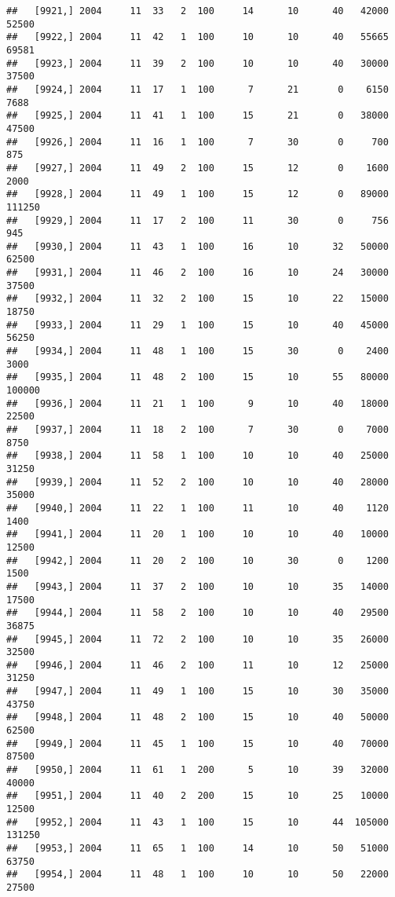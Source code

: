 \documentclass{article}\usepackage[]{graphicx}\usepackage[]{color}
\makeatletter
\newenvironment{kframe}{%
 \def\at@end@of@kframe{}%
 \ifinner\ifhmode%
  \def\at@end@of@kframe{\end{minipage}}%
  \begin{minipage}{\columnwidth}%
 \fi\fi%
 \def\FrameCommand##1{\hskip\@totalleftmargin \hskip-\fboxsep
 \colorbox{shadecolor}{##1}\hskip-\fboxsep
     \hskip-\linewidth \hskip-\@totalleftmargin \hskip\columnwidth}%
 \MakeFramed {\advance\hsize-\width
   \@totalleftmargin\z@ \linewidth\hsize
   \@setminipage}}%
 {\par\unskip\endMakeFramed%
 \at@end@of@kframe}
\newenvironment{knitrout}{}{} %
\makeatother
\begin{document}
\begin{knitrout}
\begin{kframe}
\begin{verbatim}
##   [9921,] 2004     11  33   2  100     14      10      40   42000   52500
##   [9922,] 2004     11  42   1  100     10      10      40   55665   69581
##   [9923,] 2004     11  39   2  100     10      10      40   30000   37500
##   [9924,] 2004     11  17   1  100      7      21       0    6150    7688
##   [9925,] 2004     11  41   1  100     15      21       0   38000   47500
##   [9926,] 2004     11  16   1  100      7      30       0     700     875
##   [9927,] 2004     11  49   2  100     15      12       0    1600    2000
##   [9928,] 2004     11  49   1  100     15      12       0   89000  111250
##   [9929,] 2004     11  17   2  100     11      30       0     756     945
##   [9930,] 2004     11  43   1  100     16      10      32   50000   62500
##   [9931,] 2004     11  46   2  100     16      10      24   30000   37500
##   [9932,] 2004     11  32   2  100     15      10      22   15000   18750
##   [9933,] 2004     11  29   1  100     15      10      40   45000   56250
##   [9934,] 2004     11  48   1  100     15      30       0    2400    3000
##   [9935,] 2004     11  48   2  100     15      10      55   80000  100000
##   [9936,] 2004     11  21   1  100      9      10      40   18000   22500
##   [9937,] 2004     11  18   2  100      7      30       0    7000    8750
##   [9938,] 2004     11  58   1  100     10      10      40   25000   31250
##   [9939,] 2004     11  52   2  100     10      10      40   28000   35000
##   [9940,] 2004     11  22   1  100     11      10      40    1120    1400
##   [9941,] 2004     11  20   1  100     10      10      40   10000   12500
##   [9942,] 2004     11  20   2  100     10      30       0    1200    1500
##   [9943,] 2004     11  37   2  100     10      10      35   14000   17500
##   [9944,] 2004     11  58   2  100     10      10      40   29500   36875
##   [9945,] 2004     11  72   2  100     10      10      35   26000   32500
##   [9946,] 2004     11  46   2  100     11      10      12   25000   31250
##   [9947,] 2004     11  49   1  100     15      10      30   35000   43750
##   [9948,] 2004     11  48   2  100     15      10      40   50000   62500
##   [9949,] 2004     11  45   1  100     15      10      40   70000   87500
##   [9950,] 2004     11  61   1  200      5      10      39   32000   40000
##   [9951,] 2004     11  40   2  200     15      10      25   10000   12500
##   [9952,] 2004     11  43   1  100     15      10      44  105000  131250
##   [9953,] 2004     11  65   1  100     14      10      50   51000   63750
##   [9954,] 2004     11  48   1  100     10      10      50   22000   27500

\end{verbatim}
\end{kframe}
\end{knitrout}
\end{document}
